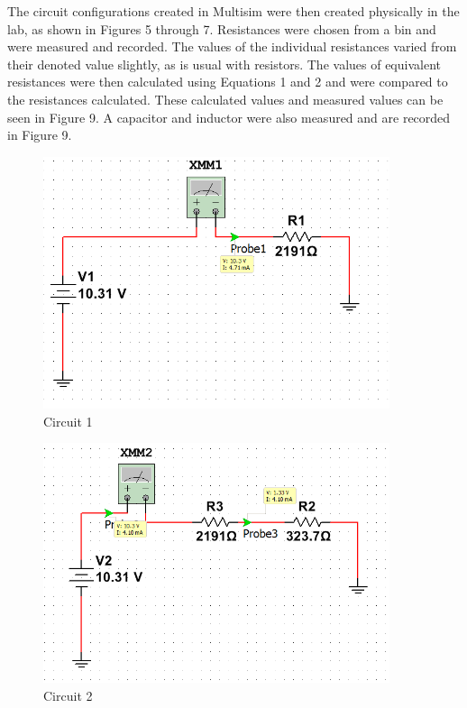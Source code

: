 \documentclass[12pt]{article}
\begin{document}
The circuit configurations created in Multisim were then created physically in the lab, as shown in Figures 5 through 7. Resistances were chosen from a bin and were measured and recorded. The values of the individual resistances varied from their denoted value slightly, as is usual with resistors. The values of equivalent resistances were then calculated using Equations 1 and 2 and were compared to the resistances calculated. These calculated values and measured values can be seen in Figure 9. A capacitor and inductor were also measured and are recorded in Figure 9.
\bigskip

\begin{figure}[h!] %
   \centering
   \includegraphics[width=4in]{Circuit_1.PNG} 
   \caption{Circuit 1}
   \label{fig:example}
\end{figure}

\newpage

\begin{figure}[h!] %
   \centering
   \includegraphics[width=4in]{Circuit_2.PNG} 
   \caption{Circuit 2}
   \label{fig:example}
\end{figure}
\end{document}
